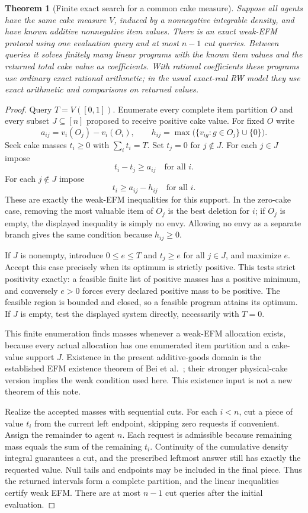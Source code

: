 \documentclass[11pt]{article}
\newtheorem{theorem}{Theorem}
\theoremstyle{definition}
\theoremstyle{remark}
\begin{document}
\begin{theorem}[Finite exact search for a common cake measure]
Suppose all agents have the same cake measure $V$, induced by a nonnegative integrable density, and have known additive nonnegative item values. There is an exact weak-EFM protocol using one evaluation query and at most $n-1$ cut queries. Between queries it solves finitely many linear programs with the known item values and the returned total cake value as coefficients. With rational coefficients these programs use ordinary exact rational arithmetic; in the usual exact-real RW model they use exact arithmetic and comparisons on returned values.
\end{theorem}
\begin{proof}
Query $T=V([0,1])$. Enumerate every complete item partition $O$ and every subset $J\subseteq[n]$ proposed to receive positive cake value. For fixed $O$ write
\[
 a_{ij}=v_i(O_j)-v_i(O_i),\qquad
 h_{ij}=\max\bigl(\{v_{ig}:g\in O_j\}\cup\{0\}\bigr).
\]
Seek cake masses $t_i\geq0$ with $\sum_i t_i=T$. Set $t_j=0$ for $j\notin J$. For each $j\in J$ impose
\[
 t_i-t_j\geq a_{ij}\quad\text{for all }i.
\]
For each $j\notin J$ impose
\[
 t_i\geq a_{ij}-h_{ij}\quad\text{for all }i.
\]
These are exactly the weak-EFM inequalities for this support. In the zero-cake case, removing the most valuable item of $O_j$ is the best deletion for $i$; if $O_j$ is empty, the displayed inequality is simply no envy. Allowing no envy as a separate branch gives the same condition because $h_{ij}\geq0$.

If $J$ is nonempty, introduce $0\leq e\leq T$ and $t_j\geq e$ for all $j\in J$, and maximize $e$. Accept this case precisely when its optimum is strictly positive. This tests strict positivity exactly: a feasible finite list of positive masses has a positive minimum, and conversely $e>0$ forces every declared positive mass to be positive. The feasible region is bounded and closed, so a feasible program attains its optimum. If $J$ is empty, test the displayed system directly, necessarily with $T=0$.

This finite enumeration finds masses whenever a weak-EFM allocation exists, because every actual allocation has one enumerated item partition and a cake-value support $J$. Existence in the present additive-goods domain is the established EFM existence theorem of Bei et al.~\cite{bei}; their stronger physical-cake version implies the weak condition used here. This existence input is not a new theorem of this note.

Realize the accepted masses with sequential cuts. For each $i<n$, cut a piece of value $t_i$ from the current left endpoint, skipping zero requests if convenient. Assign the remainder to agent $n$. Each request is admissible because remaining mass equals the sum of the remaining $t_i$. Continuity of the cumulative density integral guarantees a cut, and the prescribed leftmost answer still has exactly the requested value. Null tails and endpoints may be included in the final piece. Thus the returned intervals form a complete partition, and the linear inequalities certify weak EFM. There are at most $n-1$ cut queries after the initial evaluation.
\end{proof}
\end{document}
